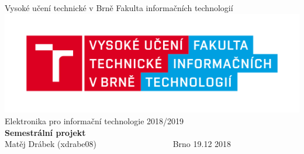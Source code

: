 \documentclass[11pt]{article}
\begin{document}
	
	\begin{titlepage}
		\begin{center}	
			\Huge{Vysoké učení technické v Brně}
			\huge{Fakulta informačních technologií}
			\includegraphics[width=\linewidth]{fit.png}
			\vspace{1cm}
			\huge{Elektronika pro informační technologie}
			\vspace{1cm}
			\huge{2018/2019}\\
			\vspace{2cm}
			\huge{\textbf{Semestrální projekt}}\\
			\vspace{5cm}
	    	\Large{Matěj Drábek (xdrabe08)~~~~~~~~~~~~~~~~~~ Brno 19.12 2018}
		\end{center}	
	\end{titlepage}
\end{document}
